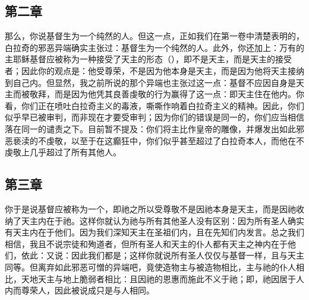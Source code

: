 
\subsection{第二章}

\par

那么，你说基督生为一个纯然的人。但这一点，正如我们在第一卷中清楚表明的，白拉奇的邪恶异端确实主张过：基督生为一个纯然的人。此外，你还加上：万有的主耶稣基督应被称为一种接受了天主的形态（），即不是天主，而是天主的接受者；因此你的观点是：他受尊荣，不是因为他本身是天主，而是因为他将天主接纳到自己内。但显然，我之前所说的那个异端也主张过这一点：基督不应因自身是天主而被敬拜，而是因为他凭其良善虔敬的行为赢得了这一点：即天主住在他内。你看，你们正在喷吐白拉奇主义的毒液，嘶嘶作响着白拉奇主义的精神。因此，你们似乎早已被审判，而非现在才要受审判；因为你们的错误是同一的，你们应当相信落在同一的谴责之下。目前暂不提及：你们将主比作皇帝的雕像，并爆发出如此邪恶亵渎的不虔敬，以至于在这癫狂中，你们似乎甚至超过了白拉奇本人，而他在不虔敬上几乎超过了所有其他人。\par


\subsection{第三章}

\par

你于是说基督应被称为一个，即祂之所以受尊敬不是因祂本身是天主，而是因祂收纳了天主内在于祂。这样你就认为祂与所有其他圣人没有区别：因为所有圣人确实有天主内在于他们。因为我们深知天主在圣祖们内，且在先知们内发言。总之我们相信，我且不说宗徒和殉道者，但所有圣人和天主的仆人都有天主之神内在于他们，依此：又说：因此我们都是；这样你就说所有圣人仅仅与基督一样，且与天主同等。但离弃如此邪恶可憎的异端吧，竟使造物主与被造物相比，主与祂的仆人相比，天地天主与地上脆弱者相比：且因祂的恩惠而施此不义于祂；即，祂因居于人内而尊荣人，因此被说成只是与人相同。\par

